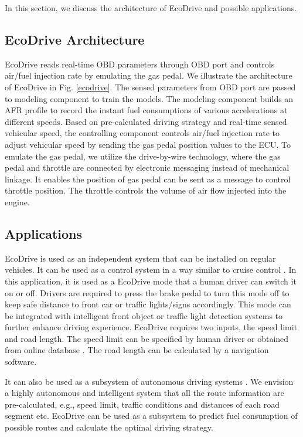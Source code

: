 



In this section, we discuss the architecture of EcoDrive and 
possible applications.


\subsection{EcoDrive Architecture}

EcoDrive reads real-time OBD parameters through OBD port
and controls air/fuel injection rate by emulating the gas pedal.
We illustrate the architecture of EcoDrive in Fig. \ref{ecodrive}.
The sensed parameters from OBD port are passed to modeling component
to train the models.
The modeling component builds an AFR profile to 
record the instant fuel consumptions of various 
accelerations at different speeds.
Based on pre-calculated driving strategy and real-time sensed vehicular speed, 
the controlling component controls air/fuel injection rate to adjust vehicular speed by 
sending the gas pedal position values to the ECU. 
To emulate the gas pedal, we utilize the drive-by-wire technology, 
where the gas pedal and throttle are connected by electronic messaging instead of mechanical linkage.   
It enables the position of gas pedal can be sent as a message
to control throttle position. 
The throttle controls the volume of air flow injected into the engine. 
 


\subsection{Applications}

EcoDrive is used as an independent system that can be installed
on regular vehicles.  
It can be used as a control system in a way similar to 
cruise control \cite{cruise_control, bengtsson2001adaptive, ioannou1993autonomous}. 
In this application, it is used as a EcoDrive mode that a human driver
can switch it on or off. 
Drivers are required to press the brake pedal to turn this mode off
to keep safe distance to front car or traffic lights/signs accordingly.
This mode can be integrated with intelligent front object or traffic light detection
systems \cite{bengtsson2001adaptive, ioannou1993autonomous} 
to further enhance driving experience. 
EcoDrive requires two inputs, the speed limit and road length. 
The speed limit can be specified by human driver or obtained from online database \cite{speedlimit}. 
The road length can be calculated by a navigation software.



It can also be used as a subsystem of autonomous driving systems 
\cite{googledriverlesscar, urmson2008autonomous, litman2013autonomous, kim2013towards}. 
We envision a highly autonomous and intelligent system that all the route
information are pre-calculated, e.g., speed limit, traffic conditions and
distances of each road segment etc. 
EcoDrive can be used as a subsystem to predict fuel consumption
of possible routes \cite{ganti2010greengps} and 
calculate the optimal driving strategy.  


